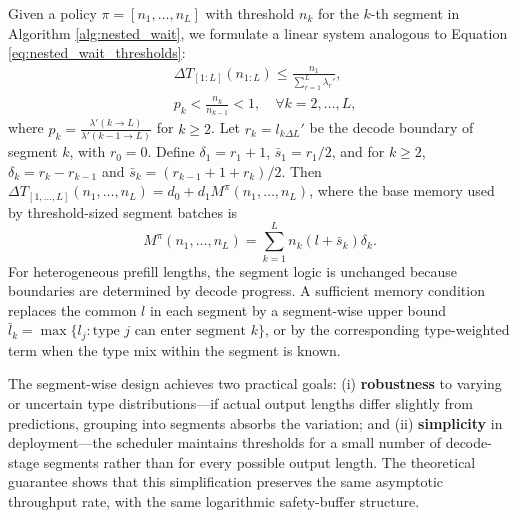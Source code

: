 Given a policy $\pi=[n_1,\dots,n_L]$ with threshold $n_k$ for the $k$-th segment in Algorithm \ref{alg:nested_wait}, we formulate a linear system analogous to Equation \eqref{eq:nested_wait_thresholds}:
\begin{equation}          \label{eq:nested_wait_thresholds_L}
    \begin{aligned}
    &\Delta T_{[1:L]}(n_{1:L}) \leq \frac{n_1}{\sum_{r=1}^L \lambda_r'},  \\
    &p_k < \frac{n_k}{n_{k-1}} < 1,\quad \forall k=2,\dots,L,
    \end{aligned}
\end{equation}
where $p_k =\frac{\lambda'(k \to L)}{\lambda'(k-1 \to L)}$ for \(k\ge2\). Let \(r_k=l_{k\Delta L}'\) be the decode boundary of segment \(k\), with \(r_0=0\). Define \(\delta_1=r_1+1\), \(\bar s_1=r_1/2\), and for \(k\ge2\), \(\delta_k=r_k-r_{k-1}\) and \(\bar s_k=(r_{k-1}+1+r_k)/2\). Then \(\Delta T_{[1,\dots,L]}(n_1,\dots,n_L) = d_0 + d_1 M^\pi(n_1, \dots, n_L)\), where the base memory used by threshold-sized segment batches is
\[
M^{\pi}(n_1, \dots, n_L) = \sum_{k=1}^L n_k (l+\bar s_k)\delta_k.
\]
For heterogeneous prefill lengths, the segment logic is unchanged because boundaries are determined by decode progress. A sufficient memory condition replaces the common \(l\) in each segment by a segment-wise upper bound \(\bar l_k=\max\{l_j: \text{type }j\text{ can enter segment }k\}\), or by the corresponding type-weighted term when the type mix within the segment is known.

The segment-wise design achieves two practical goals: (i) \textbf{robustness} to varying or uncertain type distributions---if actual output lengths differ slightly from predictions, grouping into segments absorbs the variation; and (ii) \textbf{simplicity} in deployment---the scheduler maintains thresholds for a small number of decode-stage segments rather than for every possible output length. The theoretical guarantee shows that this simplification preserves the same asymptotic throughput rate, with the same logarithmic safety-buffer structure.


